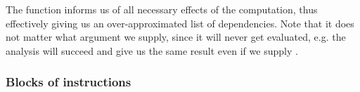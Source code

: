The  function informs us of all necessary effects of the computation, thus
effectively giving us an over-approximated list of dependencies. Note that it does not matter
what argument we supply, since it will never get evaluated, e.g. the analysis will succeed and give us the same result even if we supply .

\subsubsection{Blocks of instructions}

